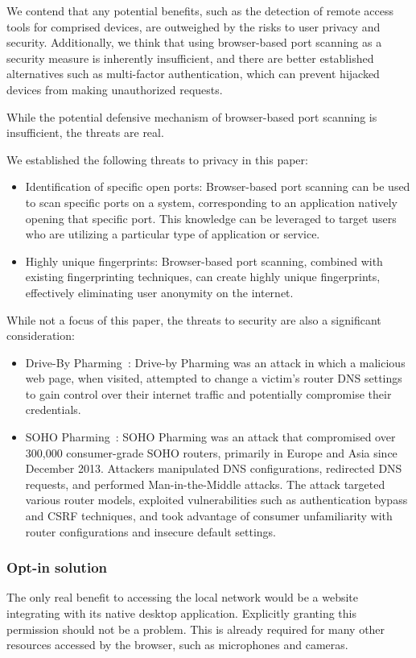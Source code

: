 We contend that any potential benefits, such as the detection of remote access tools for comprised devices, are outweighed by the risks to user privacy and security.
Additionally, we think that using browser-based port scanning as a security measure is inherently insufficient, and there are better established alternatives such as multi-factor authentication, which can prevent hijacked devices from making unauthorized requests.

While the potential defensive mechanism of browser-based port scanning is insufficient, the threats are real.

We established the following threats to privacy in this paper:
\begin{itemize}
    \item Identification of specific open ports: Browser-based port scanning can be used to scan specific ports on a system, corresponding to an application natively opening that specific port. This knowledge can be leveraged to target users who are utilizing a particular type of application or service.
    \item Highly unique fingerprints: Browser-based port scanning, combined with existing fingerprinting techniques, can create highly unique fingerprints, effectively eliminating user anonymity on the internet.
\end{itemize}

While not a focus of this paper, the threats to security are also a significant consideration:
\begin{itemize}
    \item Drive-By Pharming~\cite{stamm2007}: Drive-by Pharming was an attack in which a malicious web page, when visited, attempted to change a victim's router DNS settings to gain control over their internet traffic and potentially compromise their credentials.
    \item SOHO Pharming~\cite{sohopharming2013}: SOHO Pharming was an attack that compromised over 300,000 consumer-grade SOHO routers, primarily in Europe and Asia since December 2013. Attackers manipulated DNS configurations, redirected DNS requests, and performed Man-in-the-Middle attacks. The attack targeted various router models, exploited vulnerabilities such as authentication bypass and CSRF techniques, and took advantage of consumer unfamiliarity with router configurations and insecure default settings.
\end{itemize}

\subsubsection{Opt-in solution}
The only real benefit to accessing the local network would be a website integrating with its native desktop application. Explicitly granting this permission should not be a problem. This is already required for many other resources accessed by the browser, such as microphones and cameras.

